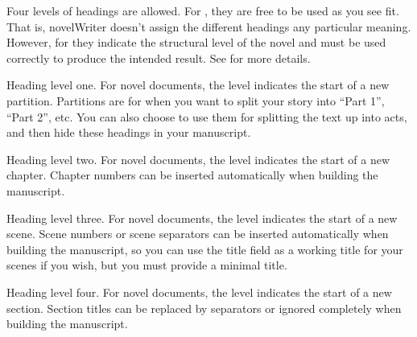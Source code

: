 \documentclass[a4paper,11pt,english]{sphinxmanual}
\begin{document}
\sphinxAtStartPar
Four levels of headings are allowed. For {\hyperref[\detokenize{int_glossary:term-Project-Notes}]{}}, they are free to be used as you see
fit. That is, novelWriter doesn’t assign the different headings any particular meaning. However,
for {\hyperref[\detokenize{int_glossary:term-Novel-Documents}]{}} they indicate the structural level of the novel and must be used
correctly to produce the intended result. See {\hyperref[\detokenize{project_structure:a-struct-heads}]{}} for more details.
\begin{description}
\sphinxAtStartPar
Heading level one. For novel documents, the level indicates the start of a new partition.
Partitions are for when you want to split your story into “Part 1”, “Part 2”, etc. You can also
choose to use them for splitting the text up into acts, and then hide these headings in your
manuscript.

\sphinxAtStartPar
Heading level two. For novel documents, the level indicates the start of a new chapter. Chapter
numbers can be inserted automatically when building the manuscript.

\sphinxAtStartPar
Heading level three. For novel documents, the level indicates the start of a new scene. Scene
numbers or scene separators can be inserted automatically when building the manuscript, so you
can use the title field as a working title for your scenes if you wish, but you must provide a
minimal title.

\sphinxAtStartPar
Heading level four. For novel documents, the level indicates the start of a new section. Section
titles can be replaced by separators or ignored completely when building the manuscript.

\end{description}
\end{document}
